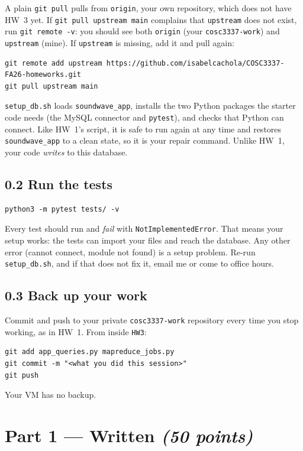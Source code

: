 \documentclass[11pt]{article}
\newcommand{\code}[1]{\texttt{#1}}
\begin{document}
A plain \code{git pull} pulls from \code{origin}, your own repository, which
does not have HW~3 yet. If \code{git pull upstream main} complains that
\code{upstream} does not exist, run \code{git remote -v}: you should see both
\code{origin} (your \code{cosc3337-work}) and \code{upstream} (mine). If
\code{upstream} is missing, add it and pull again:
\begin{lstlisting}
git remote add upstream https://github.com/isabelcachola/COSC3337-FA26-homeworks.git
git pull upstream main
\end{lstlisting}

\code{setup\_db.sh} loads \code{soundwave\_app}, installs the two Python packages
the starter code needs (the MySQL connector and \code{pytest}), and checks that
Python can connect. Like HW~1's script, it is safe to run again at any time and
restores \code{soundwave\_app} to a clean state, so it is your repair command.
Unlike HW~1, your code \emph{writes} to this database.

\subsection*{0.2 Run the tests}

\begin{lstlisting}
python3 -m pytest tests/ -v
\end{lstlisting}

Every test should run and \emph{fail} with \code{NotImplementedError}. That
means your setup works: the tests can import your files and reach the database.
Any other error (cannot connect, module not found) is a setup problem. Re-run
\code{setup\_db.sh}, and if that does not fix it, email me or come to office hours.

\subsection*{0.3 Back up your work}

Commit and push to your private \code{cosc3337-work} repository every time you
stop working, as in HW~1. From inside \code{HW3}:
\begin{lstlisting}
git add app_queries.py mapreduce_jobs.py
git commit -m "<what you did this session>"
git push
\end{lstlisting}
Your VM has no backup.

\newpage
\section*{Part 1 --- Written \hfill \textit{(50 points)}}
\end{document}
